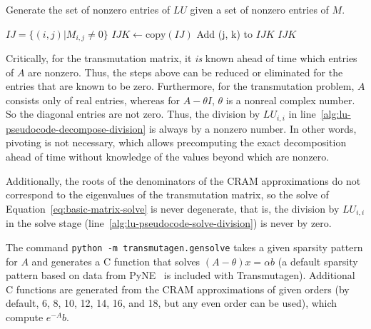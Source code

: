 \begin{algorithm}
  \caption{Generate the set of nonzero entries of $LU$ given a set of nonzero
    entries of $M$.}\label{alg:make-ijk}
  \begin{algorithmic}[1]
  \REQUIRE $IJ=\{(i, j) | M_{i, j} \neq 0\}$
  \STATE $IJK \leftarrow \mathrm{copy}(IJ)$
              \CONTINUE
          \ENDIF
          \STATE
                   \STATE Add (j, k) to $IJK$
               \ENDIF
          \ENDFOR
      \ENDFOR
  \ENDFOR
  \ENSURE $IJK$
\end{algorithmic}
\end{algorithm}

Critically, for the transmutation matrix, it \textit{is} known ahead of time
which entries of $A$ are nonzero. Thus, the steps above can be reduced or
eliminated for the entries that are known to be zero. Furthermore, for the
transmutation problem, $A$ consists only of real entries, whereas for
$A - \theta I$, $\theta$ is a nonreal complex number. So the diagonal entries
are not zero. Thus, the division by $LU_{i,i}$ in
line~\ref{alg:lu-pseudocode-decompose-division} is always by a nonzero number.
In other words, pivoting is not necessary, which allows precomputing the exact
decomposition ahead of time without knowledge of the values beyond which are
nonzero.

Additionally, the roots of the denominators of the CRAM approximations do not
correspond to the eigenvalues of the transmutation matrix, so the solve of
Equation~\ref{eq:basic-matrix-solve} is never degenerate, that is, the
division by $LU_{i,i}$ in the solve stage
(line~\ref{alg:lu-pseudocode-solve-division}) is never by zero.

The command \texttt{python -m transmutagen.gensolve} takes a given sparsity
pattern for $A$ and generates a C function that solves
$(A - \theta)x =\alpha b$ (a default sparsity pattern based on data from
PyNE~\cite{ationneeded} is included with Transmutagen). Additional C functions
are generated from the CRAM approximations of given orders (by default, 6, 8,
10, 12, 14, 16, and 18, but any even order can be used), which compute
$e^{-A}b$.

